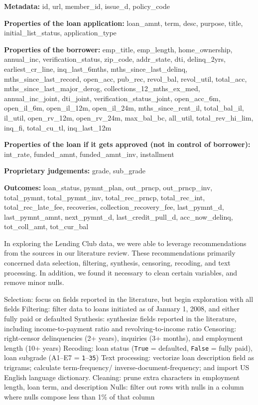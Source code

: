 {\tt\raggedright\hyphenchar{}
{\bf Metadata:}
 id,
 url,
 member\_id,
 issue\_d,
 policy\_code

{\bf Properties of the loan application:}
 loan\_amnt,
 term,
 desc,
 purpose,
 title,
 initial\_list\_status,
 application\_type

{\bf Properties of the borrower:}
 emp\_title,
 emp\_length,
 home\_ownership,
 annual\_inc,
 verification\_status,
 zip\_code,
 addr\_state,
 dti,
 delinq\_2yrs,
 earliest\_cr\_line,
 inq\_last\_6mths,
 mths\_since\_last\_delinq,
 mths\_since\_last\_record,
 open\_acc,
 pub\_rec,
 revol\_bal,
 revol\_util,
 total\_acc,
 mths\_since\_last\_major\_derog,
 collections\_12\_mths\_ex\_med,
 annual\_inc\_joint,
 dti\_joint,
 verification\_status\_joint,
 open\_acc\_6m,
 open\_il\_6m,
 open\_il\_12m,
 open\_il\_24m,
 mths\_since\_rcnt\_il,
 total\_bal\_il,
 il\_util,
 open\_rv\_12m,
 open\_rv\_24m,
 max\_bal\_bc,
 all\_util,
 total\_rev\_hi\_lim,
 inq\_fi,
 total\_cu\_tl,
 inq\_last\_12m

{\bf Properties of the loan if it gets approved (not in control of borrower):}
 int\_rate,
 funded\_amnt,
 funded\_amnt\_inv,
 installment


{\bf Proprietary judgements:}
 grade,  sub\_grade


{\bf Outcomes:}
 loan\_status,
 pymnt\_plan,
 out\_prncp,
 out\_prncp\_inv,
 total\_pymnt,
 total\_pymnt\_inv,
 total\_rec\_prncp,
 total\_rec\_int,
 total\_rec\_late\_fee,
 recoveries,
 collection\_recovery\_fee,
 last\_pymnt\_d,
 last\_pymnt\_amnt,
 next\_pymnt\_d,
 last\_credit\_pull\_d,
 acc\_now\_delinq,
 tot\_coll\_amt,
 tot\_cur\_bal

}

In exploring the Lending Club data, we were able to leverage
recommendations from the sources in our literature review. These
recommendations primarily concerned data selection, filtering,
synthesis, censoring, recoding, and text processing. In addition, we
found it necessary to clean certain variables, and remove minor nulls.

\* Selection: focus on fields reported in the literature, but begin exploration with all fields
\* Filtering: filter data to loans initiated as of January 1, 2008, and either fully paid or defaulted
\* Synthesis: synthesize fields reported in the literature, including income-to-payment ratio and revolving-to-income ratio
\* Censoring: right-censor delinquencies (2+ years), inquiries (3+ months), and employment length (10+ years)
\* Recoding: loan status ({\tt True} = defaulted, {\tt False} = fully paid), loan subgrade (A1--E7 = {\tt 1}--{\tt 35})
\* Text processing: vectorize loan description field as trigrams; calculate term-frequency/ inverse-document-frequency; and import US English language dictionary.
\* Cleaning: prune extra characters in employment length, loan term, and description
\* Nulls: filter out rows with nulls in a column where nulls compose less than 1\% of that column

